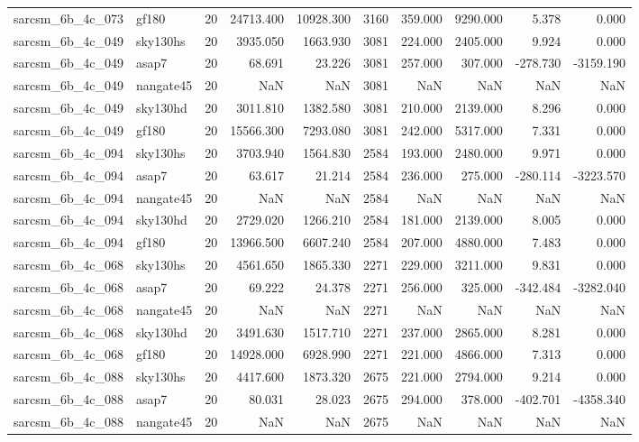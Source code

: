 \documentclass{article}
\begin{document}
\begin{longtable}{llrrrrrrrr}
sarcsm\_6b\_4c\_073 & gf180 & 20 & 24713.400 & 10928.300 & 3160 & 359.000 & 9290.000 & 5.378 & 0.000 \\
sarcsm\_6b\_4c\_049 & sky130hs & 20 & 3935.050 & 1663.930 & 3081 & 224.000 & 2405.000 & 9.924 & 0.000 \\
sarcsm\_6b\_4c\_049 & asap7 & 20 & 68.691 & 23.226 & 3081 & 257.000 & 307.000 & -278.730 & -3159.190 \\
sarcsm\_6b\_4c\_049 & nangate45 & 20 & NaN & NaN & 3081 & NaN & NaN & NaN & NaN \\
sarcsm\_6b\_4c\_049 & sky130hd & 20 & 3011.810 & 1382.580 & 3081 & 210.000 & 2139.000 & 8.296 & 0.000 \\
sarcsm\_6b\_4c\_049 & gf180 & 20 & 15566.300 & 7293.080 & 3081 & 242.000 & 5317.000 & 7.331 & 0.000 \\
sarcsm\_6b\_4c\_094 & sky130hs & 20 & 3703.940 & 1564.830 & 2584 & 193.000 & 2480.000 & 9.971 & 0.000 \\
sarcsm\_6b\_4c\_094 & asap7 & 20 & 63.617 & 21.214 & 2584 & 236.000 & 275.000 & -280.114 & -3223.570 \\
sarcsm\_6b\_4c\_094 & nangate45 & 20 & NaN & NaN & 2584 & NaN & NaN & NaN & NaN \\
sarcsm\_6b\_4c\_094 & sky130hd & 20 & 2729.020 & 1266.210 & 2584 & 181.000 & 2139.000 & 8.005 & 0.000 \\
sarcsm\_6b\_4c\_094 & gf180 & 20 & 13966.500 & 6607.240 & 2584 & 207.000 & 4880.000 & 7.483 & 0.000 \\
sarcsm\_6b\_4c\_068 & sky130hs & 20 & 4561.650 & 1865.330 & 2271 & 229.000 & 3211.000 & 9.831 & 0.000 \\
sarcsm\_6b\_4c\_068 & asap7 & 20 & 69.222 & 24.378 & 2271 & 256.000 & 325.000 & -342.484 & -3282.040 \\
sarcsm\_6b\_4c\_068 & nangate45 & 20 & NaN & NaN & 2271 & NaN & NaN & NaN & NaN \\
sarcsm\_6b\_4c\_068 & sky130hd & 20 & 3491.630 & 1517.710 & 2271 & 237.000 & 2865.000 & 8.281 & 0.000 \\
sarcsm\_6b\_4c\_068 & gf180 & 20 & 14928.000 & 6928.990 & 2271 & 221.000 & 4866.000 & 7.313 & 0.000 \\
sarcsm\_6b\_4c\_088 & sky130hs & 20 & 4417.600 & 1873.320 & 2675 & 221.000 & 2794.000 & 9.214 & 0.000 \\
sarcsm\_6b\_4c\_088 & asap7 & 20 & 80.031 & 28.023 & 2675 & 294.000 & 378.000 & -402.701 & -4358.340 \\
sarcsm\_6b\_4c\_088 & nangate45 & 20 & NaN & NaN & 2675 & NaN & NaN & NaN & NaN \\

\end{longtable}
\end{document}
